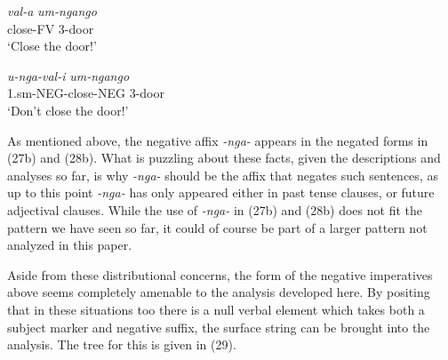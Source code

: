 \documentclass[output=paper]{langsci/langscibook}
\newcommand{\nga}[0]{\textit {-nga- }}
\begin{document}
\begin{exe}
\ex \begin{xlist}
\ex \gll \textit{val-a} \textit{um-ngango}\\
        close-FV 3-door\\
    \glt `Close the door!'


\ex \gll \textit{u-nga-val-i} \textit{um-ngango}\\
        1.{\sc sm}-NEG-close-NEG 3-door\\
    \glt `Don't close the door!'
\end{xlist}
\end{exe}

As mentioned above, the negative affix \nga appears in the negated forms in (27b) and (28b). What is puzzling about these facts, given the descriptions and analyses so far, is why \nga should be the affix that negates such sentences, as up to this point \nga has only appeared either in past tense clauses, or future adjectival clauses. While the use of \nga in (27b) and (28b) does not fit the pattern we have seen so far, it could of course be part of a larger pattern not analyzed in this paper.

Aside from these distributional concerns, the form of the negative imperatives above seems completely amenable to the analysis developed here. By positing that in these situations too there is a null verbal element which takes both a subject marker and negative suffix, the surface string can be brought into the analysis. The tree for this is given in (29).
\end{document}
